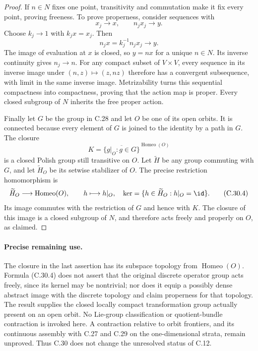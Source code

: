\begin{proof}
If $n\in N$ fixes one point, transitivity and commutation make it
fix every point, proving freeness. To prove properness, consider
sequences with
\[
                  x_j\longrightarrow x,\qquad
                  n_jx_j\longrightarrow y.
\]
Choose $k_j\to1$ with $k_jx=x_j$. Then
\[
                n_jx=k_j^{-1}n_jx_j\longrightarrow y.    \tag{C.30.3}
\]
The image of evaluation at $x$ is closed, so $y=nx$ for a unique
$n\in N$. Its inverse continuity gives $n_j\to n$.
For any compact subset of $V\times V$, every sequence in its
inverse image under $(n,z)\mapsto(z,nz)$ therefore has a convergent
subsequence, with limit in the same inverse image. Metrizability
turns this sequential compactness into compactness, proving that
the action map is proper. Every closed subgroup of $N$ inherits
the free proper action.

Finally let $G$ be the group in C.28 and let $O$ be one of its open
orbits. It is connected because every element of $G$ is joined to
the identity by a path in $G$. The closure
\[
        K=\overline{\{g|_O:g\in G\}}
                       ^{\operatorname{Homeo}(O)}
\]
is a closed Polish group still transitive on $O$. Let $\widetilde H$
be any group commuting with $G$, and let $\widetilde H_O$ be its
setwise stabilizer of $O$. The precise restriction homomorphism is
\[
 \widetilde H_O\longrightarrow\operatorname{Homeo}(O),\qquad
 h\longmapsto h|_O,
 \quad
 \ker=\{h\in\widetilde H_O:h|_O=\id\}.                 \tag{C.30.4}
\]
Its image commutes with the restriction of $G$ and hence with $K$.
The closure of this image is a closed subgroup of $N$, and therefore
acts freely and properly on $O$, as claimed.
\end{proof}

\paragraph{Precise remaining use.}
The closure in the last assertion has its subspace topology from
$\operatorname{Homeo}(O)$. Formula (C.30.4) does not assert that the
original discrete operator group acts freely, since its kernel may
be nontrivial; nor does it equip a possibly dense abstract image with
the discrete topology and claim properness for that topology.
The result supplies the closed locally compact transformation group
actually present on an open orbit. No Lie-group classification or
quotient-bundle contraction is invoked here. A contraction relative
to orbit frontiers, and its continuous assembly with C.27 and C.29
on the one-dimensional strata, remain unproved. Thus C.30 does not
change the unresolved status of C.12.
